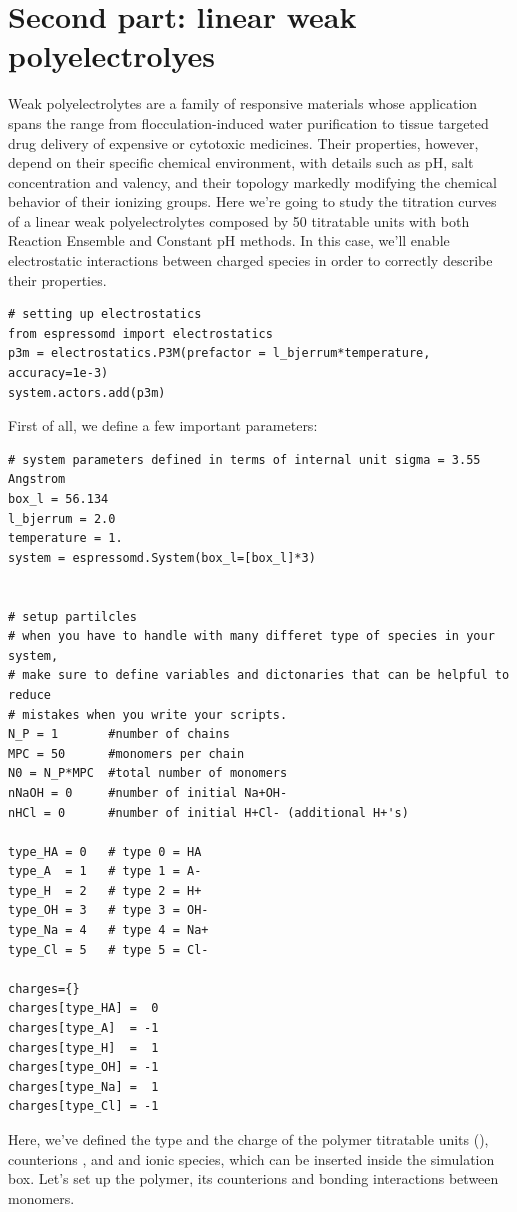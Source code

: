 \documentclass[
a4paper,                        %
11pt,                           %
twoside,                        %
footsepline,                    %
headsepline,                    %
headexclude,                    %
footexclude,                    %
pagesize,                       %
]{scrartcl}
\begin{document}
\section{Second part: linear weak polyelectrolyes}
Weak polyelectrolytes are a family of responsive materials whose application spans the range from flocculation-induced water purification to tissue targeted drug delivery of expensive or cytotoxic medicines. Their properties, however, depend on their specific chemical environment, with details such as pH, salt concentration and valency, and their topology markedly modifying the chemical behavior of their ionizing groups.
Here we're going to study the titration curves of a linear weak polyelectrolytes composed by 50 titratable units with both Reaction Ensemble and Constant pH methods. In this case, we'll enable electrostatic interactions between charged species in order to correctly describe their properties.
\begin{verbatim}
# setting up electrostatics
from espressomd import electrostatics
p3m = electrostatics.P3M(prefactor = l_bjerrum*temperature, accuracy=1e-3) 
system.actors.add(p3m)
\end{verbatim}
First of all, we define a few important  parameters:
\begin{verbatim}
# system parameters defined in terms of internal unit sigma = 3.55 Angstrom 
box_l = 56.134 
l_bjerrum = 2.0 
temperature = 1.
system = espressomd.System(box_l=[box_l]*3)


# setup partilcles
# when you have to handle with many differet type of species in your system,
# make sure to define variables and dictonaries that can be helpful to reduce
# mistakes when you write your scripts.
N_P = 1       #number of chains
MPC = 50      #monomers per chain
N0 = N_P*MPC  #total number of monomers
nNaOH = 0     #number of initial Na+OH-
nHCl = 0      #number of initial H+Cl- (additional H+'s)

type_HA = 0   # type 0 = HA
type_A  = 1   # type 1 = A-
type_H  = 2   # type 2 = H+
type_OH = 3   # type 3 = OH-
type_Na = 4   # type 4 = Na+
type_Cl = 5   # type 5 = Cl-

charges={}
charges[type_HA] =  0    
charges[type_A]  = -1     
charges[type_H]  =  1
charges[type_OH] = -1
charges[type_Na] =  1
charges[type_Cl] = -1 
\end{verbatim}
Here, we've defined the type and the charge of the polymer titratable units (), counterions , and  and  ionic species, which can be inserted inside the simulation box. Let's set up the polymer, its counterions and bonding interactions between monomers. 
\end{document}
